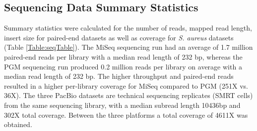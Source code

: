 \documentclass[smallextended]{svjour3}\usepackage[]{graphicx}\usepackage[]{color}
\begin{document}
\subsection{Sequencing Data Summary Statistics}
Summary statistics were calculated for the number of reads, mapped read length, insert size for paired-end datasets as well as coverage for \textit{S. aureus} datasets (Table \ref{Table:seqTable}). The MiSeq sequencing run had an average of  1.7 million paired-end reads per library with a median read length of  232 bp,  whereas the PGM sequencing run produced 0.2 million reads per library on average with a median read length of 232 bp.  The higher throughput and paired-end reads resulted in a higher per-library coverage for MiSeq compared to PGM (251X vs. 36X).  The three PacBio datasets are technical sequencing replicates (SMRT cells) from the same sequencing library, with a median subread length 10436bp and 302X total coverage. Between the three platforms a total coverage of 4611X was obtained.
\end{document}
